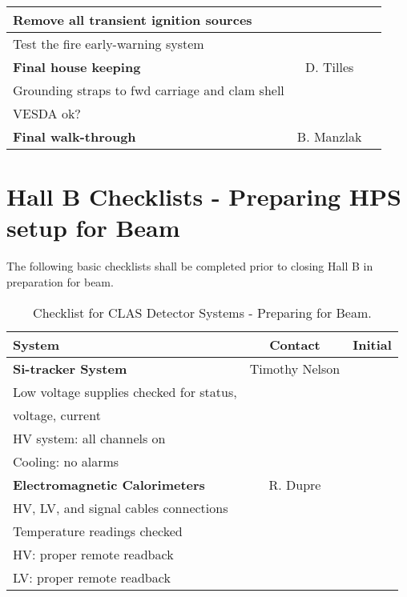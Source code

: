 \begin{table}[p]
\begin{center}
\begin{tabular}{|l|c|c|}
Remove all transient ignition sources           & & \\ \hline  
Test the fire early-warning system              & & \\ \hline 
\bf{Final house keeping}                        & D. Tilles & \\ \hline 
Grounding straps to fwd carriage and clam shell & & \\ \hline 
VESDA ok?                                       & & \\ \hline 	
\bf{Final walk-through}                         & B. Manzlak & \\ \hline 
\end{tabular}
\end{center}
\end{table}             

\newpage

\begin{table}[p] 
\section{Hall B Checklists - Preparing HPS setup for Beam}
The following basic checklists shall be completed prior to closing Hall B 
in preparation for beam.
\caption{\label{table:beamC} Checklist for CLAS Detector Systems - Preparing 
for Beam.} 
\begin{center}
  \begin{tabular}{|l|c|c|} \hline
System &  \hspace{1.0cm}Contact\hspace{1.0cm}       &  Initial  \\ \hline
\bf{Si-tracker System}                           &Timothy Nelson  & \\ \hline 
Low voltage supplies checked for status,            & & \\
voltage, current                                    & & \\ \hline 
HV system: all channels on                          & & \\ \hline 
Cooling: no alarms                                      & & \\ \hline 
\bf{Electromagnetic Calorimeters}       & R. Dupre& \\ \hline
HV, LV, and signal cables connections                    & & \\ \hline 
Temperature readings checked                              & & \\ \hline
HV: proper remote readback                          & & \\ \hline 
LV: proper remote readback                          & & \\ \hline 
\end{tabular}
\end{center}
\end{table}             

